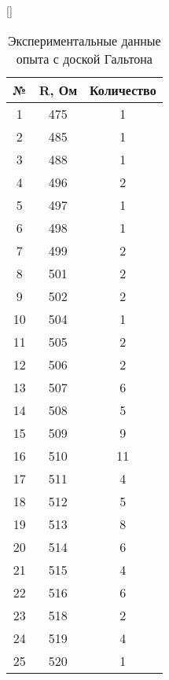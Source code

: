 \begin{center}[]
	\begin{longtable}{|c|c|c|}
		\caption[Экспериментальные данные опыта с доской Гальтона]{Экспериментальные данные опыта с доской Гальтона} \label{ap:table:3} \\
		\hline
		\multicolumn{1}{|c|}{\textbf{№}} &
		\multicolumn{1}{c|}{\textbf{R, Ом}} & 
		\multicolumn{1}{c|}{\textbf{Количество}} \\ \hline
		\endfirsthead
		
		1   & 475           & 1          \\ \hline
		2   & 485           & 1          \\ \hline
		3   & 488           & 1          \\ \hline
		4   & 496           & 2          \\ \hline
		5   & 497           & 1          \\ \hline
		6   & 498           & 1          \\ \hline
		7   & 499           & 2          \\ \hline
		8   & 501           & 2          \\ \hline
		9   & 502           & 2          \\ \hline
		10  & 504           & 1          \\ \hline
		11  & 505           & 2          \\ \hline
		12  & 506           & 2          \\ \hline
		13  & 507           & 6          \\ \hline
		14  & 508           & 5          \\ \hline
		15  & 509           & 9          \\ \hline
		16  & 510           & 11         \\ \hline
		17  & 511           & 4          \\ \hline
		18  & 512           & 5          \\ \hline
		19  & 513           & 8          \\ \hline
		20  & 514           & 6          \\ \hline
		21  & 515           & 4          \\ \hline
		22  & 516           & 6          \\ \hline
		23  & 518           & 2          \\ \hline
		24  & 519           & 4          \\ \hline
		25  & 520           & 1          \\ \hline

\end{longtable}
\end{center}
